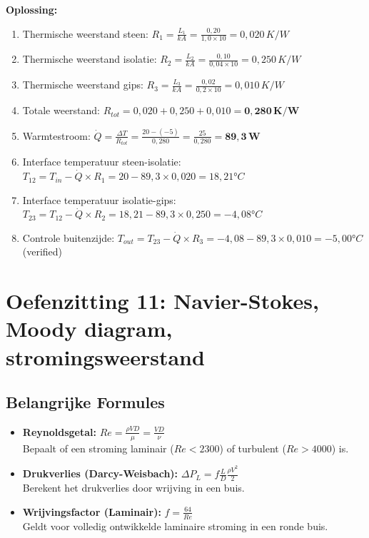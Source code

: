 \documentclass[a4paper,11pt,twoside]{report}
\newcounter{opgave}[section]
\begin{document}
\textbf{Oplossing:}
\begin{enumerate}
    \item Thermische weerstand steen: $R_1 = \frac{L_1}{k A} = \frac{0{,}20}{1{,}0 \times 10} = 0{,}020 \, K/W$
    \item Thermische weerstand isolatie: $R_2 = \frac{L_2}{k A} = \frac{0{,}10}{0{,}04 \times 10} = 0{,}250 \, K/W$
    \item Thermische weerstand gips: $R_3 = \frac{L_3}{k A} = \frac{0{,}02}{0{,}2 \times 10} = 0{,}010 \, K/W$
    \item Totale weerstand: $R_{tot} = 0{,}020 + 0{,}250 + 0{,}010 = \mathbf{0{,}280 \, K/W}$
    \item Warmtestroom: $\dot{Q} = \frac{\Delta T}{R_{tot}} = \frac{20 - (-5)}{0{,}280} = \frac{25}{0{,}280} = \mathbf{89{,}3 \, W}$
    \item Interface temperatuur steen-isolatie: $T_{12} = T_{in} - \dot{Q} \times R_1 = 20 - 89{,}3 \times 0{,}020 = 18{,}21°C$
    \item Interface temperatuur isolatie-gips: $T_{23} = T_{12} - \dot{Q} \times R_2 = 18{,}21 - 89{,}3 \times 0{,}250 = -4{,}08°C$
    \item Controle buitenzijde: $T_{out} = T_{23} - \dot{Q} \times R_3 = -4{,}08 - 89{,}3 \times 0{,}010 = -5{,}00°C$ (verified)
\end{enumerate}


\section{Oefenzitting 11: Navier-Stokes, Moody diagram, stromingsweerstand}
\setcounter{opgave}{0}
\subsection*{Belangrijke Formules}
\begin{itemize}
    \item \textbf{Reynoldsgetal:} $Re = \frac{\rho V D}{\mu} = \frac{V D}{\nu}$ \\
    Bepaalt of een stroming laminair ($Re < 2300$) of turbulent ($Re > 4000$) is.
    \item \textbf{Drukverlies (Darcy-Weisbach):} $\Delta P_L = f \frac{L}{D} \frac{\rho V^2}{2}$ \\
    Berekent het drukverlies door wrijving in een buis.
    \item \textbf{Wrijvingsfactor (Laminair):} $f = \frac{64}{Re}$ \\
    Geldt voor volledig ontwikkelde laminaire stroming in een ronde buis.
\end{itemize}
\end{document}
